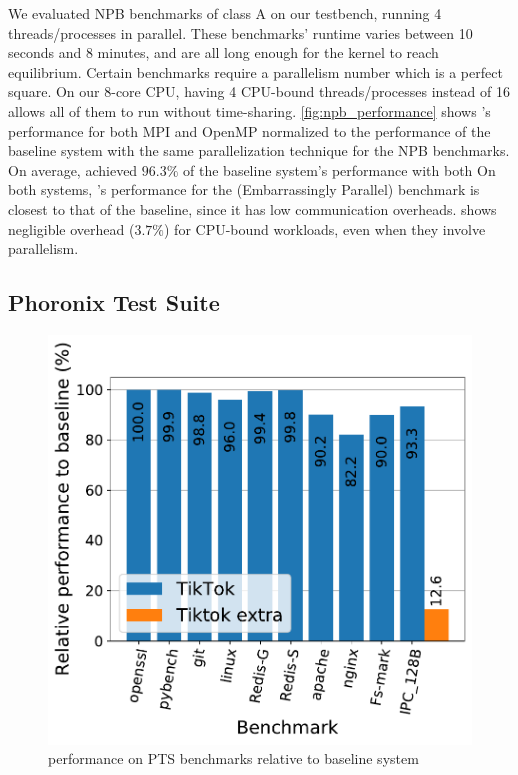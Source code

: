 \documentclass[letterpaper,twocolumn,10pt, anonymous]{article}
\begin{document}
We evaluated NPB benchmarks of class A on our testbench, running 
4 threads/processes in parallel.
These benchmarks' runtime varies between 10 seconds and 8 minutes, 
and are all long enough for the kernel to reach equilibrium.
Certain benchmarks require a parallelism number which is a perfect square.
On our 8-core CPU, having 4 CPU-bound threads/processes instead of 16 allows 
all of them to run without time-sharing.
\autoref{fig:npb_performance} shows \tiktok's performance for both MPI and OpenMP 
normalized to the performance of the baseline system with the same parallelization
technique for the NPB benchmarks.
On average, \tiktok achieved $96.3\%$ of the baseline system's performance with 
both 
On both systems, \tiktok's performance for the  (Embarrassingly Parallel)
benchmark is closest to that of the baseline, since it has low 
communication overheads.
\tiktok shows negligible overhead ($3.7\%$) for CPU-bound workloads, even when they 
involve parallelism.


\subsection{Phoronix Test Suite}

\begin{figure}[]
  \includegraphics[width=\linewidth]{img/pts_performance.pdf}
  \caption{\tiktok performance on PTS benchmarks relative to baseline system}
  \label{fig:pts_performance}
\end{figure}
\end{document}
